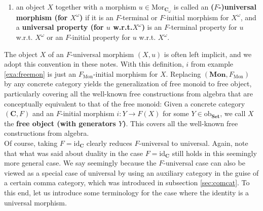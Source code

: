 \begin{enumerate}
\begin{enumerate}
\begin{align*}
  f_{!}
  &\in
  \mathrm{mor}_{\mathbf{C}}(X,X_{1})
\end{align*}
such that
\begin{align*}
  f
  &=
  F(f_{!})
  \circ
  i
\end{align*}
that is, such that the diagram
\[
\begin{tikzcd}[sep=large]
  &
  F(X)
  \arrow[swap]{dl}{F(f_{!})}
  &
  \\
  F(X_{1})
  &
  &
  X^{\omega}
  \arrow{ll}{f}
  \arrow[swap]{lu}{i}
\end{tikzcd}
\]
commutes
\end{enumerate}
we refer to (FIP) as an \textbf{($F$-)initial property (for $i$ w.r.t. $X^{\omega}$)}
\item[(3)]
an object $X$ together with a morphism $u \in \mathrm{Mor}_{\mathbf{C}_{\omega}}$ is called an \textbf{($F$-)universal morphism (for $X^{\omega}$)} if it is an $F$-terminal or $F$-initial morphism for $X^{\omega}$, and a \textbf{universal property (for $u$ w.r.t.$X^{\omega}$)} is an $F$-terminal property for $u$ w.r.t. $X^{\omega}$ or an $F$-initial property for $u$ w.r.t. $X^{\omega}$.
\end{enumerate}
The object $X$ of an $F$-universal morphism $(X,u)$ is often left implicit, and we adopt this convention in these notes.
With this definition, $i$ from example \ref{exa:freemon} is just an $F_{\textrm{Mon}}$-initial morphism for $X$.
Replacing $(\mathbf{Mon},F_{\textrm{Mon}})$ by any concrete category yields the generalization of free monoid to free object, particularly covering all the well-known {\grqq}free{\grqq} constructions from algebra that are conceptually equivalent to that of the free monoid: Given a concrete category $(\mathbf{C},F)$ and an $F$-initial morphism $i \colon Y \rightarrow F(X)$ for some $Y \in \mathrm{ob}_{\mathbf{Set}}$, we call $X$ the \textbf{free object (with generators $Y$)}.
This covers all the well-known {\glqq}free{\grqq} constructions from algebra.
\\
Of course, taking $F = \mathrm{id}_{\mathbf{C}}$ clearly reduces $F$-universal to universal.
Again, note that what was said about duality in the case $F = \mathrm{id}_{\mathbf{C}}$ still holds in this seemingly more general case.
We say {\glqq}seemingly{\grqq} because the $F$-universal case can also be viewed as a special case of universal by using an auxiliary category in the guise of a certain comma category, which was introduced in subsection \ref{sec:comcat}.
To this end, let us introduce some terminology for the case where the identity is a universal morphism.
